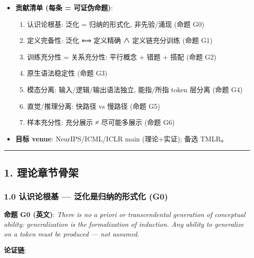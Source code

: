\documentclass[
]{article}
\providecommand{\tightlist}{%
  \setlength{\itemsep}{0pt}\setlength{\parskip}{0pt}}
\begin{document}
\begin{itemize}
\tightlist
\item
  \textbf{贡献清单 (每条 = 可证伪命题)}:

  \begin{enumerate}
  \def\labelenumi{\arabic{enumi}.}
  \tightlist
  \item
    认识论根基: 泛化 = 归纳的形式化, 非先验/涌现 (命题 G0)
  \item
    定义完备性: 泛化 ⟺ 定义精确 ∧ 定义链充分训练 (命题 G1)
  \item
    训练充分性 = 关系充分性: 平行概念 + 错题 + 搭配 (命题 G2)
  \item
    原生语法稳定性 (命题 G3)
  \item
    模态分离: 输入/逻辑/输出语法独立, 能指/所指 token 层分离 (命题 G4)
  \item
    直觉/推理分离: 快路径 vs 慢路径 (命题 G5)
  \item
    样本充分性: 充分展示 ≠ 尽可能多展示 (命题 G6)
  \end{enumerate}
\item
  \textbf{目标 venue}: NeurIPS/ICML/ICLR main (理论+实证); 备选 TMLR。
\end{itemize}

\begin{center}\rule{0.5\linewidth}{0.5pt}\end{center}

\subsection{1. 理论章节骨架}\label{ux7406ux8bbaux7ae0ux8282ux9aa8ux67b6}

\subsubsection{1.0 认识论根基 --- 泛化是归纳的形式化
(G0)}\label{ux8ba4ux8bc6ux8bbaux6839ux57fa-ux6cdbux5316ux662fux5f52ux7eb3ux7684ux5f62ux5f0fux5316-g0}

\textbf{命题 G0 (英文)}: \emph{There is no a priori or transcendental
generation of conceptual ability: generalization is the formalization of
induction. Any ability to generalize on a token must be produced --- not
assumed.}

\textbf{论证链}:
\end{document}
